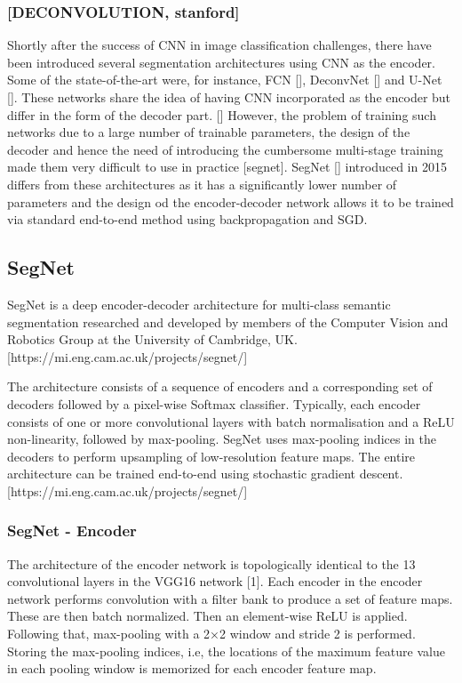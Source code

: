 \subsubsection{[DECONVOLUTION, stanford]}

Shortly after the success of CNN in image classification challenges, there have been introduced several segmentation architectures using CNN as the encoder. Some of the state-of-the-art were, for instance, FCN [], DeconvNet [] and U-Net []. These networks share the idea of having CNN incorporated as the encoder but differ in the form
of the decoder part. [] However, the problem of training such networks due to a large number of trainable parameters, the design of the decoder and hence the need of introducing the cumbersome multi-stage training made them very difficult to use in practice [segnet]. SegNet [] introduced in 2015 differs from these architectures as it has a significantly lower number of parameters and the design od the encoder-decoder network allows it to be trained via standard end-to-end method using backpropagation and SGD. 

\subsection{SegNet}

SegNet is a deep encoder-decoder architecture for multi-class semantic segmentation researched and developed by members of the Computer Vision and Robotics Group at the University of Cambridge, UK. [https://mi.eng.cam.ac.uk/projects/segnet/]

The architecture consists of a sequence of encoders and a corresponding set of decoders followed by a pixel-wise Softmax classifier. Typically, each encoder consists of one or more convolutional layers with batch normalisation and a ReLU non-linearity, followed by max-pooling. SegNet uses max-pooling indices in the decoders to perform upsampling of low-resolution feature maps. The entire architecture can be trained end-to-end using stochastic gradient descent.  [https://mi.eng.cam.ac.uk/projects/segnet/]

\subsubsection{SegNet - Encoder}

The architecture of the encoder network is topologically identical to the 13 convolutional layers in the VGG16 network [1]. Each encoder in the encoder network performs convolution with a filter bank to produce a set of feature maps. These are then batch normalized. Then an element-wise ReLU is applied. Following that, max-pooling with a 2×2 window and stride 2 is performed. Storing the max-pooling indices, i.e, the locations of the maximum feature value in each pooling window is memorized for each encoder feature map.

